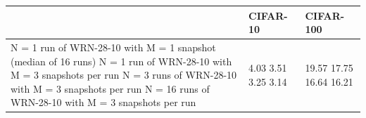\begin{tabular}{lll}
\toprule
 & CIFAR-10 & CIFAR-100 \\
\midrule
N = 1 run of WRN-28-10 with M = 1 snapshot (median of 16 runs) N = 1 run of WRN-28-10 with M = 3 snapshots per run N = 3 runs of WRN-28-10 with M = 3 snapshots per run N = 16 runs of WRN-28-10 with M = 3 snapshots per run & 4.03 3.51 3.25 3.14 & 19.57 17.75 16.64 16.21 \\
\bottomrule
\end{tabular}
